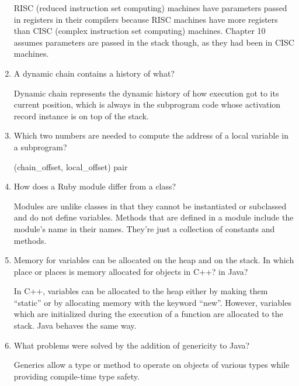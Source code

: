 \begin{enumerate}
	\begin{answer}
RISC (reduced instruction set computing) machines have parameters passed in registers in their compilers because RISC machines have more registers than CISC (complex instruction set computing) machines. Chapter 10 assumes parameters are passed in the stack though, as they had been in CISC machines.
	\end{answer}

  \item A dynamic chain contains a history of what?

	\begin{answer}
Dynamic chain represents the dynamic history of how execution got to its current position, which is always in the subprogram code whose activation record instance is on top of the stack.
	\end{answer}

  \item Which two numbers are needed to compute
    the address of a local variable in a subprogram?

	\begin{answer}
	(chain\_offset, local\_offset) pair
	\end{answer}

  \item How does a Ruby module differ from a class?

	\begin{answer}
Modules are unlike classes in that they cannot be instantiated or subclassed and do not define variables. Methods that are defined in a module include the  module’s name in their names. They're just a collection of constants and methods.
	\end{answer}

  \item Memory for variables can be allocated on the heap
    and on the stack. In which place or places is memory
    allocated for objects in C++? in Java?

	\begin{answer}
In C++, variables can be allocated to the heap either by making them “static” or by allocating memory with the keyword “new”. However, variables which are initialized during the execution of a function are allocated to the stack. Java behaves the same way. 
	\end{answer}

  \item What problems were solved by the addition
    of genericity to Java?
        \begin{answer}
Generics allow a type or method to operate on objects of various types while providing compile-time type safety.
	\end{answer}


\end{enumerate}

